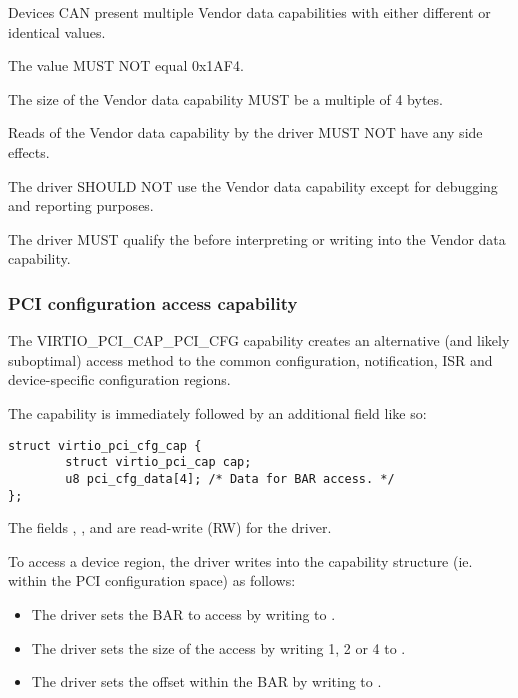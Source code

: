 Devices CAN present multiple Vendor data capabilities with
either different or identical  values.

The value  MUST NOT equal 0x1AF4.

The size of the Vendor data capability MUST be a multiple of 4 bytes.

Reads of the Vendor data capability by the driver MUST NOT have any
side effects.


The driver SHOULD NOT use the Vendor data capability except
for debugging and reporting purposes.

The driver MUST qualify the  before
interpreting or writing into the Vendor data capability.

\subsubsection{PCI configuration access capability}\label{sec:Virtio Transport Options / Virtio Over PCI Bus / PCI Device Layout / PCI configuration access capability}

The VIRTIO_PCI_CAP_PCI_CFG capability
creates an alternative (and likely suboptimal) access method to the
common configuration, notification, ISR and device-specific configuration regions.

The capability is immediately followed by an additional field like so:

\begin{lstlisting}
struct virtio_pci_cfg_cap {
        struct virtio_pci_cap cap;
        u8 pci_cfg_data[4]; /* Data for BAR access. */
};
\end{lstlisting}

The fields , ,  and
 are read-write (RW) for the driver.

To access a device region, the driver writes into the capability
structure (ie. within the PCI configuration space) as follows:

\begin{itemize}
\item The driver sets the BAR to access by writing to .

\item The driver sets the size of the access by writing 1, 2 or 4 to
  .

\item The driver sets the offset within the BAR by writing to
  .
\end{itemize}

